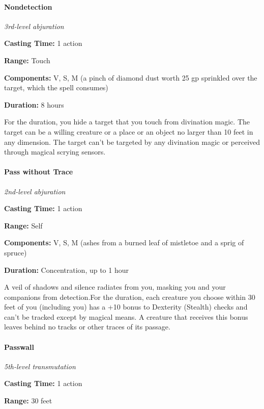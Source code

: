 \documentclass[
]{article}
\begin{document}
\hypertarget{nondetection}{%
\paragraph{Nondetection}\label{nondetection}}

\emph{3rd-level abjuration}

\textbf{Casting Time:} 1 action

\textbf{Range:} Touch

\textbf{Components:} V, S, M (a pinch of diamond dust worth 25 gp
sprinkled over the target, which the spell consumes)

\textbf{Duration:} 8 hours

For the duration, you hide a target that you touch from divination
magic. The target can be a willing creature or a place or an object no
larger than 10 feet in any dimension. The target can't be targeted by
any divination magic or perceived through magical scrying sensors.

\hypertarget{pass-without-trace}{%
\paragraph{Pass without Trace}\label{pass-without-trace}}

\emph{2nd-level abjuration}

\textbf{Casting Time:} 1 action

\textbf{Range:} Self

\textbf{Components:} V, S, M (ashes from a burned leaf of mistletoe and
a sprig of spruce)

\textbf{Duration:} Concentration, up to 1 hour

A veil of shadows and silence radiates from you, masking you and your
companions from detection.For the duration, each creature you choose
within 30 feet of you (including you) has a +10 bonus to Dexterity
(Stealth) checks and can't be tracked except by magical means. A
creature that receives this bonus leaves behind no tracks or other
traces of its passage.

\hypertarget{passwall}{%
\paragraph{Passwall}\label{passwall}}

\emph{5th-level transmutation}

\textbf{Casting Time:} 1 action

\textbf{Range:} 30 feet
\end{document}
